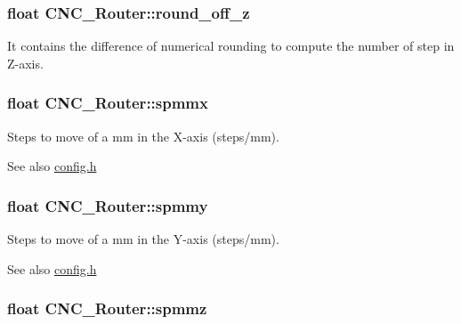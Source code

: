 \hypertarget{class_c_n_c___router_a777a55ac1be584ef2a827d412bf9ae40}{
\subsubsection[{round\+\_\+off\+\_\+z}]{\setlength{\rightskip}{0pt plus 5cm}float C\+N\+C\+\_\+\+Router\+::round\+\_\+off\+\_\+z\hspace{0.3cm}{\ttfamily [private]}}}\label{class_c_n_c___router_a777a55ac1be584ef2a827d412bf9ae40}


It contains the difference of numerical rounding to compute the number of step in Z-\/axis. 

\hypertarget{class_c_n_c___router_ad8830a7b387905027b8a1a9e3b31e3c7}{
\subsubsection[{spmmx}]{\setlength{\rightskip}{0pt plus 5cm}float C\+N\+C\+\_\+\+Router\+::spmmx\hspace{0.3cm}{\ttfamily [private]}}}\label{class_c_n_c___router_ad8830a7b387905027b8a1a9e3b31e3c7}


Steps to move of a mm in the X-\/axis (steps/mm). 

\begin{DoxySeeAlso}{See also}
\hyperlink{config_8h}{config.\+h} 
\end{DoxySeeAlso}
\hypertarget{class_c_n_c___router_ab44dd3a48e5c03f3484cd223cb8f9444}{
\subsubsection[{spmmy}]{\setlength{\rightskip}{0pt plus 5cm}float C\+N\+C\+\_\+\+Router\+::spmmy\hspace{0.3cm}{\ttfamily [private]}}}\label{class_c_n_c___router_ab44dd3a48e5c03f3484cd223cb8f9444}


Steps to move of a mm in the Y-\/axis (steps/mm). 

\begin{DoxySeeAlso}{See also}
\hyperlink{config_8h}{config.\+h} 
\end{DoxySeeAlso}
\hypertarget{class_c_n_c___router_a18bda26476d6fbe11fc6bb6ec69171ea}{
\subsubsection[{spmmz}]{\setlength{\rightskip}{0pt plus 5cm}float C\+N\+C\+\_\+\+Router\+::spmmz\hspace{0.3cm}{\ttfamily [private]}}}\label{class_c_n_c___router_a18bda26476d6fbe11fc6bb6ec69171ea}


